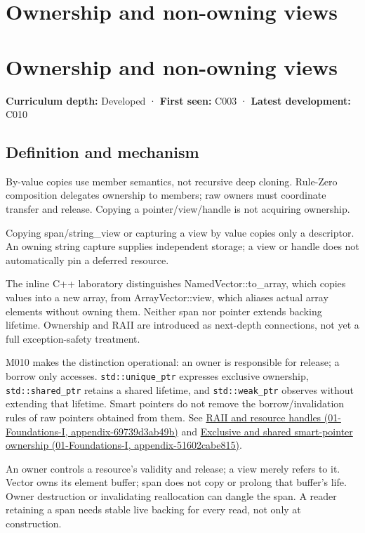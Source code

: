 \hypertarget{appendix-d52e4486f527}{}
\section*{Ownership and non-owning views}
\section{Ownership and non-owning views}\label{ownership-and-non-owning-views}

\textbf{Curriculum depth:} Developed · \textbf{First seen:} C003 · \textbf{Latest development:} C010

\subsection{Definition and mechanism}\label{definition-and-mechanism}

By-value copies use member semantics, not recursive deep cloning. Rule-Zero composition delegates ownership to members; raw owners must coordinate transfer and release. Copying a pointer/view/handle is not acquiring ownership.

Copying span/string\_view or capturing a view by value copies only a descriptor. An owning string capture supplies independent storage; a view or handle does not automatically pin a deferred resource.

The inline C++ laboratory distinguishes NamedVector::to\_array, which copies values into a new array, from ArrayVector::view, which aliases actual array elements without owning them. Neither span nor pointer extends backing lifetime. Ownership and RAII are introduced as next-depth connections, not yet a full exception-safety treatment.

M010 makes the distinction operational: an owner is responsible for release; a borrow only accesses. \texttt{std::unique\_ptr} expresses exclusive ownership, \texttt{std::shared\_ptr} retains a shared lifetime, and \texttt{std::weak\_ptr} observes without extending that lifetime. Smart pointers do not remove the borrow/invalidation rules of raw pointers obtained from them. See \href{}{RAII and resource handles (01-Foundations-I, appendix-69739d3ab49b)} and \href{}{Exclusive and shared smart-pointer ownership (01-Foundations-I, appendix-51602cabe815)}.

An owner controls a resource's validity and release; a view merely refers to it. Vector owns its element buffer; span does not copy or prolong that buffer's life. Owner destruction or invalidating reallocation can dangle the span. A reader retaining a span needs stable live backing for every read, not only at construction.

